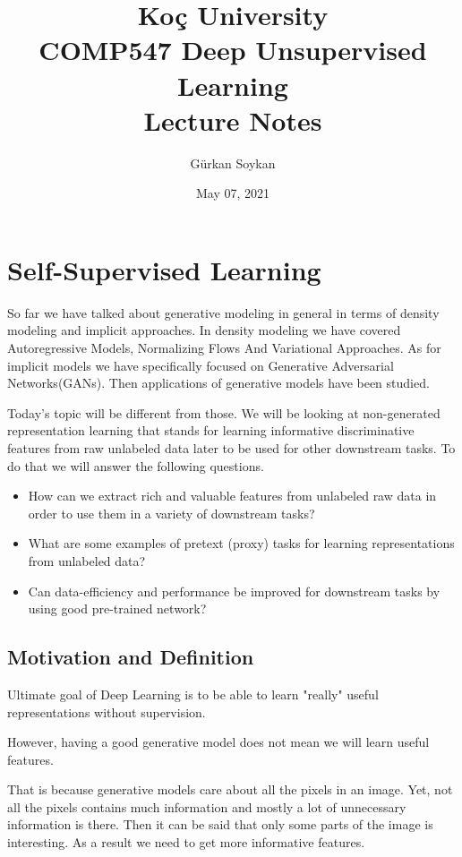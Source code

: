 \documentclass{article}
\title{Ko\c{c} University
\\COMP547 Deep Unsupervised Learning
\\ Lecture Notes}
\author{Gürkan Soykan}
\date{May 07, 2021}
\begin{document}
   \maketitle
   \setcounter{section}{7}
   \section{Self-Supervised Learning}
   So far we have talked about generative modeling in general in terms
of density modeling and implicit approaches. In density modeling
we have covered Autoregressive Models, Normalizing Flows And
Variational Approaches. As for implicit models we have specifically
focused on Generative Adversarial Networks(GANs). Then applications
of generative models have been studied.
 
\par
Today's topic will be different from those. We will be looking
at non-generated representation learning that stands for
learning informative discriminative features from raw unlabeled data
later to be used for other downstream tasks. To do that we will
answer the following questions.
 
\begin{itemize}
   \item How can we extract rich and valuable 
   features from unlabeled raw data in order to use 
   them in a variety of downstream tasks? 
   \item What are some examples of pretext (proxy) tasks 
   for learning representations from unlabeled data?   
   \item Can data-efficiency
   and performance be improved for downstream tasks
   by using good pre-trained network?
\end{itemize}
 
\subsection{Motivation and Definition}
\label{sec:subsections}
 
Ultimate goal of Deep Learning is to be able to learn
"really" useful representations without supervision.
 
However, having a good generative model does not mean
we will learn useful features.
 
That is because generative models care about all the
pixels in an image. Yet, not all the pixels contains much information
and mostly a lot of unnecessary information is there.
Then it can be said that only some parts of the image is
interesting. As a result we need to get more informative features.
 
\end{document}

